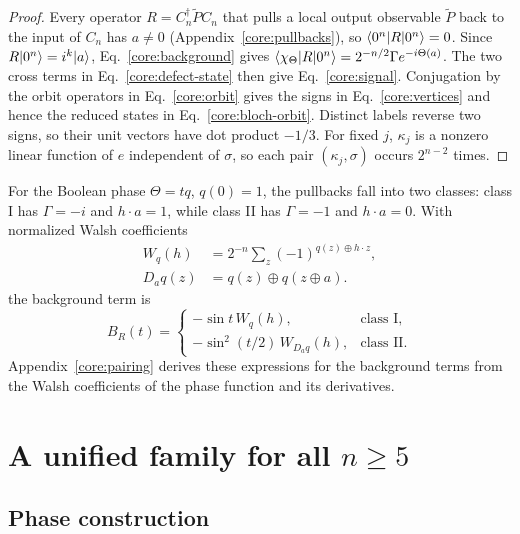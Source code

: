 \begin{proof}
Every operator $R=C_n^\dagger\widetilde P C_n$ that pulls a local output observable $\widetilde P$ back to the input of $C_n$ has $a\ne0$ (Appendix~\ref{core:pullbacks}), so $\langle 0^n\rvert R\lvert 0^n\rangle=0$. Since $R\lvert 0^n\rangle=i^k\lvert a\rangle$, Eq.~\eqref{core:background} gives $\langle \chi_\Theta\rvert R\lvert 0^n\rangle=2^{-n/2}\Gamma e^{-i\Theta(a)}$. The two cross terms in Eq.~\eqref{core:defect-state} then give Eq.~\eqref{core:signal}.
Conjugation by the orbit operators in Eq.~\eqref{core:orbit} gives the signs in Eq.~\eqref{core:vertices} and hence the reduced states in Eq.~\eqref{core:bloch-orbit}. Distinct labels reverse two signs, so their unit vectors have dot product $-1/3$. For fixed $j$, $\kappa_j$ is a nonzero linear function of $e$ independent of $\sigma$, so each pair $(\kappa_j,\sigma)$ occurs $2^{n-2}$ times.
\end{proof}

For the Boolean phase $\Theta=tq$, $q(0)=1$, the pullbacks fall into two classes: class I has $\Gamma=-i$ and $h\cdot a=1$, while class II has $\Gamma=-1$ and $h\cdot a=0$. With normalized Walsh coefficients
\begin{equation}
 \begin{aligned}
 W_q(h)&=2^{-n}\sum_z(-1)^{q(z)\oplus h\cdot z},\\
 D_aq(z)&=q(z)\oplus q(z\oplus a).
 \end{aligned}
 \label{core:walsh-def}
\end{equation}
the background term is
\begin{equation}
 B_R(t)=\begin{cases}
 -\sin t\,W_q(h),&\text{class I},\\
 -\sin^2(t/2)\,W_{D_aq}(h),&\text{class II}.
 \end{cases}
 \label{core:boolean-background}
\end{equation}
Appendix~\ref{core:pairing} derives these expressions for the background terms from the Walsh coefficients of the phase function and its derivatives.

\section{A unified family for all \texorpdfstring{$n\ge5$}{n >= 5}}
\label{core:unified}

\subsection{Phase construction}

